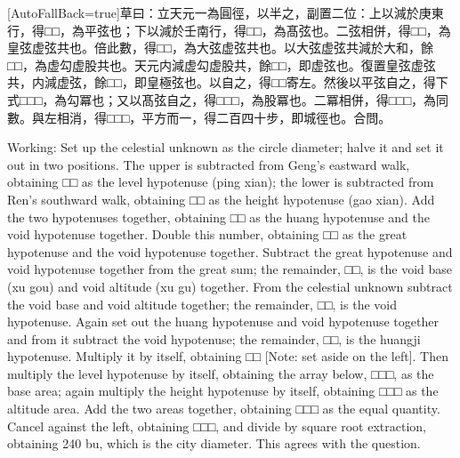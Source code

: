 \documentclass[11pt]{article}
\newcommand{\zhsmall}{\footnotesize\color{black!70}}
\newcommand{\unitlabel}[1]{\marginpar{\raggedleft\tiny\color{gray}#1}}
\newenvironment{unitzh}{\par\CJKfontspec{Noto Serif CJK SC}[AutoFallBack=true]\large\linespread{1.25}\selectfont}{\par}
\newenvironment{uniten}{\par\small\color{black!85}}{\par\medskip}
\begin{document}
\begin{unitzh}\unitlabel{ceyuan-026.20}草曰：立天元一為圓徑，以半之，副置二位：上以減於庚東行，得□□，為平弦也；下以減於壬南行，得□□，為髙弦也。二弦相併，得□□，為皇弦虚弦共也。倍此數，得□□，為大弦虚弦共也。以大弦虚弦共減於大和，餘□□，為虚勾虚股共也。天元内減虚勾虚股共，餘□□，即虚弦也。復置皇弦虚弦共，内減虚弦，餘□□，即皇極弦也。以自之，得□□{\zhsmall 寄左}。然後以平弦自之，得下式□□□，為勾冪也；又以髙弦自之，得□□□，為股冪也。二冪相併，得□□□，為同數。與左相消，得□□□，平方而一，得二百四十步，即城徑也。合問。\end{unitzh}
\begin{uniten}Working: Set up the celestial unknown as the circle diameter; halve it and set it out in two positions. The upper is subtracted from Geng's eastward walk, obtaining □□ as the level hypotenuse (ping xian); the lower is subtracted from Ren's southward walk, obtaining □□ as the height hypotenuse (gao xian). Add the two hypotenuses together, obtaining □□ as the huang hypotenuse and the void hypotenuse together. Double this number, obtaining □□ as the great hypotenuse and the void hypotenuse together. Subtract the great hypotenuse and void hypotenuse together from the great sum; the remainder, □□, is the void base (xu gou) and void altitude (xu gu) together. From the celestial unknown subtract the void base and void altitude together; the remainder, □□, is the void hypotenuse. Again set out the huang hypotenuse and void hypotenuse together and from it subtract the void hypotenuse; the remainder, □□, is the huangji hypotenuse. Multiply it by itself, obtaining □□ [Note: set aside on the left]. Then multiply the level hypotenuse by itself, obtaining the array below, □□□, as the base area; again multiply the height hypotenuse by itself, obtaining □□□ as the altitude area. Add the two areas together, obtaining □□□ as the equal quantity. Cancel against the left, obtaining □□□, and divide by square root extraction, obtaining 240 bu, which is the city diameter. This agrees with the question.\end{uniten}
\end{document}
